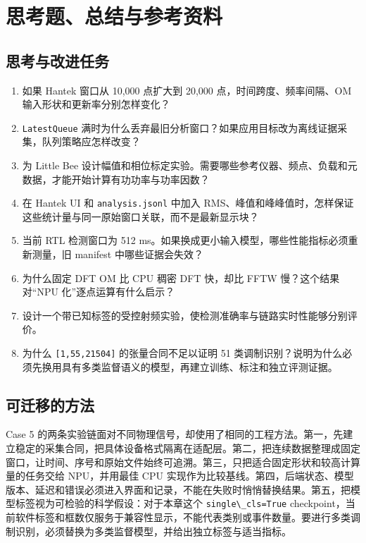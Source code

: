 \section{思考题、总结与参考资料}\label{src-experiment-case5-summary}

\subsection{思考与改进任务}\label{src-experiment-case5-exercises}

\begin{enumerate}
\def\labelenumi{\arabic{enumi}.}
\tightlist
\item
  如果 Hantek 窗口从 10,000 点扩大到 20,000 点，时间跨度、频率间隔、OM
  输入形状和更新率分别怎样变化？
\item
  \passthrough{\lstinline!LatestQueue!}
  满时为什么丢弃最旧分析窗口？如果应用目标改为离线证据采集，队列策略应怎样改变？
\item
  为 Little Bee
  设计幅值和相位标定实验。需要哪些参考仪器、频点、负载和元数据，才能开始计算有功功率与功率因数？
\item
  在 Hantek UI 和 \passthrough{\lstinline!analysis.jsonl!} 中加入
  RMS、峰值和峰峰值时，怎样保证这些统计量与同一原始窗口关联，而不是最新显示块？
\item
  当前 RTL 检测窗口为 512
  ms。如果换成更小输入模型，哪些性能指标必须重新测量，旧 manifest
  中哪些证据会失效？
\item
  为什么固定 DFT OM 比 CPU 稠密 DFT 快，却比 FFTW 慢？这个结果对``NPU
  化''逐点运算有什么启示？
\item
  设计一个带已知标签的受控射频实验，使检测准确率与链路实时性能够分别评价。
\item
  为什么 \passthrough{\lstinline![1,55,21504]!} 的张量合同不足以证明 51
  类调制识别？说明为什么必须先换用具有多类监督语义的模型，再建立训练、标注和独立评测证据。
\end{enumerate}

\subsection{可迁移的方法}\label{src-experiment-case5-conclusion}

Case 5
的两条实验链面对不同物理信号，却使用了相同的工程方法。第一，先建立稳定的采集合同，把具体设备格式隔离在适配层。第二，把连续数据整理成固定窗口，让时间、序号和原始文件始终可追溯。第三，只把适合固定形状和较高计算量的任务交给
NPU，并用最佳 CPU
实现作为比较基线。第四，后端状态、模型版本、延迟和错误必须进入界面和记录，不能在失败时悄悄替换结果。第五，把模型标签视为可检验的科学假设：对于本章这个
\passthrough{\lstinline!single\_cls=True!}
checkpoint，当前软件标签和框数仅服务于兼容性显示，不能代表类别或事件数量。要进行多类调制识别，必须替换为多类监督模型，并给出独立标签与适当指标。

